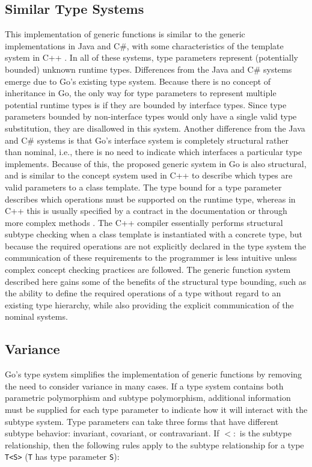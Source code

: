 \documentclass[letterpaper,11pt]{article}
\begin{document}
\subsection{Similar Type Systems} \label{similartypesystems}

This implementation of generic functions is similar to the generic implementations in Java and C\#, with some characteristics of the template system in C++ \cite{ghosh2004generics} \cite{csharp}. In all of these systems, type parameters represent (potentially bounded) unknown runtime types. Differences from the Java and C\# systems emerge due to Go's existing type system. Because there is no concept of inheritance in Go, the only way for type parameters to represent multiple potential runtime types is if they are bounded by interface types. Since type parameters bounded by non-interface types would only have a single valid type substitution, they are disallowed in this system. Another difference from the Java and C\# systems is that Go's interface system is completely structural rather than nominal, i.e., there is no need to indicate which interfaces a particular type implements. Because of this, the proposed generic system in Go is also structural, and is similar to the concept system used in C++ to describe which types are valid parameters to a class template. The type bound for a type parameter describes which operations must be supported on the runtime type, whereas in C++ this is usually specified by a contract in the documentation or through more complex methods \cite{siek2000concept}. The C++ compiler essentially performs structural subtype checking when a class template is instantiated with a concrete type, but because the required operations are not explicitly declared in the type system the communication of these requirements to the programmer is less intuitive unless complex concept checking practices are followed. The generic function system described here gains some of the benefits of the structural type bounding, such as the ability to define the required operations of a type without regard to an existing type hierarchy, while also providing the explicit communication of the nominal systems.

\subsection{Variance} \label{variance}

Go's type system simplifies the implementation of generic functions by removing the need to consider variance in many cases. If a type system contains both parametric polymorphism and subtype polymorphism, additional information must be supplied for each type parameter to indicate how it will interact with the subtype system. Type parameters can take three forms that have different subtype behavior: invariant, covariant, or contravariant. If $<:$ is the subtype relationship, then the following rules apply to the subtype relationship for a type \texttt{T<S>} (\texttt{T} has type parameter \texttt{S}):
\end{document}
